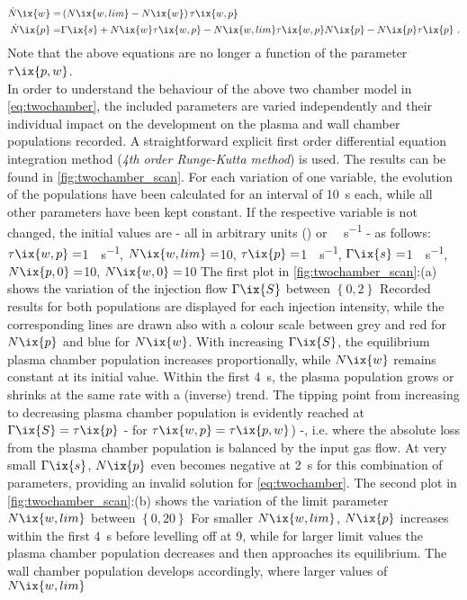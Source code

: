 %
            \begin{align}%
                \begin{split}\label{eq:twochamber}%
                    \dot{N}\ix{w}=&\left(N\ix{w,lim}-N\ix{w}\right)\tau\ix{w,p}\\%
                    \dot{N}\ix{p}=&\Gamma\ix{s}+N\ix{w}\tau\ix{w,p}-N\ix{w,lim}\tau\ix{w,p}N\ix{p}-N\ix{p}\tau\ix{p}\,\,.%
                \end{split}%
            \end{align}%
%
            Note that the above equations are no longer a function of the parameter $\tau\ix{p,w}$.\\%
            In order to understand the behaviour of the above two chamber model in \cref{eq:twochamber}, the included parameters are varied independently and their individual impact on the development on the plasma and wall chamber populations recorded. A straightforward explicit first order differential equation integration method (\textit{4th order Runge-Kutta method}\cite{WikiRungeKutta}) is used. The results can be found in \cref{fig:twochamber_scan}. For each variation of one variable, the evolution of the populations have been calculated for an interval of \SI{10}{\second} each, while all other parameters have been kept constant. If the respective variable is not changed, the initial values are - all in arbitrary units (\SI{}{\arbitraryunit}) or \SI{}{\arbitraryunit\per\second} - as follows: $\tau\ix{w,p}=$\SI{1}{\arbitraryunit\per\second}, $N\ix{w,lim}=$\SI{10}{\arbitraryunit}, $\tau\ix{p}=$\SI{1}{\arbitraryunit\per\second}, $\Gamma\ix{s}=$\SI{1}{\arbitraryunit\per\second}, $N\ix{p,0}=$\SI{10}{\arbitraryunit}, $N\ix{w,0}=$\SI{10}{\arbitraryunit} The first plot in \cref{fig:twochamber_scan}:(a) shows the variation of the injection flow $\Gamma\ix{S}$ between $\left\{0, 2\right\}$\SI{}{\arbitraryunit} Recorded results for both populations are displayed for each injection intensity, while the corresponding lines are drawn also with a colour scale between grey and red for $N\ix{p}$ and blue for $N\ix{w}$. With increasing $\Gamma\ix{S}$, the equilibrium plasma chamber population increases proportionally, while $N\ix{w}$ remains constant at its initial value. Within the first \SI{4}{\second}, the plasma population grows or shrinks at the same rate with a (inverse)  trend. The tipping point from increasing to decreasing plasma chamber population is evidently reached at $\Gamma\ix{S}=\tau\ix{p}$ - for  $\tau\ix{w,p}=\tau\ix{p,w}$) -, i.e. where the absolute loss from the plasma chamber population is balanced by the input gas flow. At very small $\Gamma\ix{s}$, $N\ix{p}$ even becomes negative at \SI{2}{\second} for this combination of parameters, providing an invalid solution for \cref{eq:twochamber}. The second plot in \cref{fig:twochamber_scan}:(b) shows the variation of the limit parameter $N\ix{w,lim}$ between $\left\{0, 20\right\}$\SI{}{\arbitraryunit} For smaller $N\ix{w,lim}$, $N\ix{p}$ increases within the first \SI{4}{\second} before levelling off at \SI{9}{\arbitraryunit}, while for larger limit values the plasma chamber population decreases and then approaches its equilibrium. The wall chamber population develops accordingly, where larger values of $N\ix{w,lim}$ 
